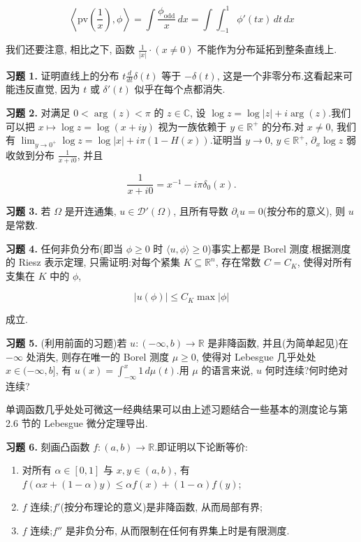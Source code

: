 \[
\left\langle\mathrm{pv}\left(\frac{1}{x}\right), \phi\right\rangle = \int\frac{\phi_{\mathrm{odd}}}{x}\, dx = \int\int_{-1}^1\phi'(tx)\, dt\, dx
\]

我们还要注意, 相比之下, 函数 $\frac{1}{|x|}\cdot(x\neq 0)$ 不能作为分布延拓到整条直线上.

\textbf{习题 1.} 证明直线上的分布 $t\frac{d}{dt}\delta(t)$ 等于 $-\delta(t)$, 这是一个非零分布.这看起来可能违反直觉, 因为 $t$ 或 $\delta'(t)$ 似乎在每个点都消失.

\textbf{习题 2.} 对满足 $0<\arg(z)<\pi$ 的 $z\in\mathbb{C}$, 设 $\log z = \log|z| + i\arg(z)$.我们可以把 $x\mapsto\log z = \log(x+iy)$ 视为一族依赖于 $y\in\mathbb{R}^+$ 的分布.对 $x\neq 0$, 我们有 $\lim_{y\to 0^+}\log z = \log|x| + i\pi(1-H(x))$.证明当 $y\to 0$, $y\in\mathbb{R}^+$, $\partial_x\log z$ 弱收敛到分布 $\frac{1}{x+i0}$, 并且

\begin{equation}
\frac{1}{x+i0} = x^{-1} - i\pi\delta_0(x).\label{eq:c3-129}
\end{equation}

\textbf{习题 3.} 若 $\Omega$ 是开连通集, $u\in\mathcal{D}'(\Omega)$, 且所有导数 $\partial_i u = 0$(按分布的意义), 则 $u$ 是常数.

\textbf{习题 4.} 任何非负分布(即当 $\phi\geq 0$ 时 $\langle u, \phi\rangle\geq 0$)事实上都是 Borel 测度.根据测度的 Riesz 表示定理, 只需证明:对每个紧集 $K\subseteq\mathbb{R}^n$, 存在常数 $C = C_K$, 使得对所有支集在 $K$ 中的 $\phi$,

\[
|u(\phi)|\leq C_K\max|\phi|
\]

成立.

\textbf{习题 5.} (利用前面的习题)若 $u : (-\infty, b)\to\mathbb{R}$ 是非降函数, 并且(为简单起见)在 $-\infty$ 处消失, 则存在唯一的 Borel 测度 $\mu\geq 0$, 使得对 Lebesgue 几乎处处 $x\in(-\infty, b]$, 有 $u(x) = \int_{-\infty}^x 1\, d\mu(t)$.用 $\mu$ 的语言来说, $u$ 何时连续?何时绝对连续?

\begin{remark*}
单调函数几乎处处可微这一经典结果可以由上述习题结合一些基本的测度论与第 2.6 节的 Lebesgue 微分定理导出.
\end{remark*}

\textbf{习题 6.} 刻画凸函数 $f : (a, b)\to\mathbb{R}$.即证明以下论断等价:

\begin{enumerate}
\item 对所有 $\alpha\in[0, 1]$ 与 $x, y\in(a, b)$, 有 $f(\alpha x+(1-\alpha)y)\leq\alpha f(x)+(1-\alpha)f(y)$;
\item $f$ 连续;$f'$(按分布理论的意义)是非降函数, 从而局部有界;
\item $f$ 连续;$f''$ 是非负分布, 从而限制在任何有界集上时是有限测度.
\end{enumerate}

